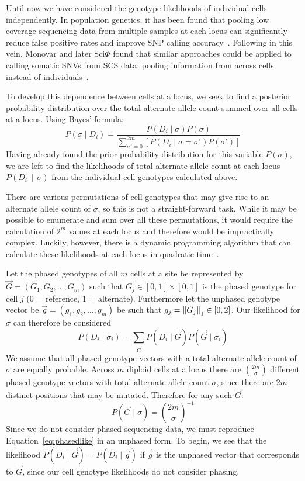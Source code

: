 \documentclass[../../main.tex]{subfiles}
\begin{document}
Until now we have considered the genotype likelihoods of individual cells independently.
In population genetics, it has been found that pooling low coverage sequencing data from multiple samples at each locus can significantly reduce false positive rates and improve SNP calling accuracy~\cite{ledurbin, listatistical}.
Following in this vein, Monovar and later Sci$\Phi$ found that similar approaches could be applied to calling somatic SNVs from SCS data: pooling information from across cells instead of individuals~\cite{monovar, sciphi}.

To develop this dependence between cells at a locus, we seek to find a posterior probability distribution over the total alternate allele count summed over all cells at a locus.
Using Bayes' formula:
\begin{equation}\label{eq:sitebayes}
P\left(\sigma \mid D_i\right) = \frac{P(D_i\mid \sigma)P(\sigma)}{\sum_{\sigma'=0}^{2m}[P(D_i\mid \sigma=\sigma')P(\sigma')]}
\end{equation}
Having already found the prior probability distribution for this variable $P(\sigma)$, we are left to find the likelihoods of total alternate allele count at each locus $P(D_i\,\mid\,\sigma)$ from the individual cell genotypes calculated above.

There are various permutations of cell genotypes that may give rise to an alternate allele count of $\sigma$, so this is not a straight-forward task.
While it may be possible to enumerate and sum over all these permutations, it would require the calculation of $2^m$ values at each locus and therefore would be impractically complex.
Luckily, however, there is a dynamic programming algorithm that can calculate these likelihoods at each locus in quadratic time~\cite{ledurbin, listatistical, monovar}.

Let the phased genotypes of all $m$ cells at a site be represented by $\vec{G} = (G_1,G_2,\dots,G_m)$ such that $G_j\in [0,1]\times[0,1]$ is the phased genotype for cell $j$ (0 = reference, 1 = alternate).
Furthermore let the unphased genotype vector be $\vec{g} = (g_1,g_2,\dots,g_m)$ be such that $g_j = \left\lVert G_j\right\rVert_1\in[0,2]$.
Our likelihood for $\sigma$ can therefore be considered
\begin{equation} \label{eq:phasedlike}
P(D_i\mid\sigma_i) = \sum_{\vec{G}} P(D_i \mid \vec{G}) P(\vec{G} \mid \sigma_i)
\end{equation}
We assume that all phased genotype vectors with a total alternate allele count of $\sigma$ are equally probable.
Across $m$ diploid cells at a locus there are $\binom{2m}{\sigma}$ different phased genotype vectors with total alternate allele count $\sigma$, since there are $2m$ distinct positions that may be mutated.
Therefore for any such $\vec{G}$:
\begin{equation*}
P(\vec{G}\mid \sigma) = \binom{2m}{\sigma}^{-1}
\end{equation*}
Since we do not consider phased sequencing data, we must reproduce Equation~\eqref{eq:phasedlike} in an unphased form.
To begin, we see that the likelihood $P(D_i\mid \vec{G}) = P(D_i\mid \vec{g})$ if $\vec{g}$ is the unphased vector that corresponds to $\vec{G}$, since our cell genotype likelihoods do not consider phasing.
\end{document}
